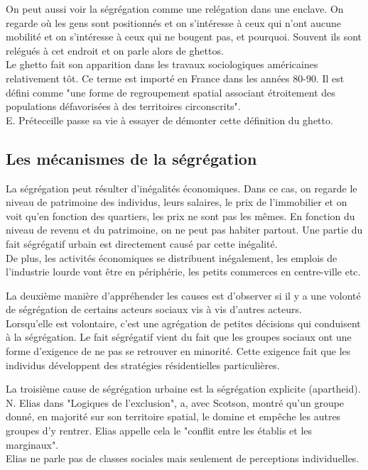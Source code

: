 \documentclass[12pt, a4paper, openany]{book}
\begin{document}
On peut aussi voir la ségrégation comme une relégation dans une enclave. On regarde où les gens sont positionnés et on s'intéresse à ceux qui n'ont aucune mobilité et on s'intéresse à ceux qui ne bougent pas, et pourquoi. Souvent ils sont relégués à cet endroit et on parle alors de ghettos. \\
Le ghetto fait son apparition dans les travaux sociologiques américaines relativement tôt. Ce terme est importé en France dans les années 80-90. Il est défini comme "une forme de regroupement spatial associant étroitement des populations défavorisées à des territoires circonscrits". \\
E. Préteceille passe sa vie à essayer de démonter cette définition du ghetto. 

\subsection{Les mécanismes de la ségrégation}

La ségrégation peut résulter d'inégalités économiques. Dans ce cas, on regarde le niveau de patrimoine des individus, leurs salaires, le prix de l'immobilier et on voit qu'en fonction des quartiers, les prix ne sont pas les mêmes. En fonction du niveau de revenu et du patrimoine, on ne peut pas habiter partout. Une partie du fait ségrégatif urbain est directement causé par cette inégalité. \\
De plus, les activités économiques se distribuent inégalement, les emplois de l'industrie lourde vont être en périphérie, les petits commerces en centre-ville etc. 


La deuxième manière d'appréhender les causes est d'observer si il y a une volonté de ségrégation de certains acteurs sociaux vis à vis d'autres acteurs. \\
Lorsqu'elle est volontaire, c'est une agrégation de petites décisions qui conduisent à la ségrégation. Le fait ségrégatif vient du fait que les groupes sociaux ont une forme d'exigence de ne pas se retrouver en minorité. Cette exigence fait que les individus développent des stratégies résidentielles particulières. 


La troisième cause de ségrégation urbaine est la ségrégation explicite (apartheid). N. Elias dans "Logiques de l'exclusion", a, avec Scotson, montré qu'un groupe donné, en majorité sur son territoire spatial, le domine et empêche les autres groupes d'y rentrer. Elias appelle cela le "conflit entre les établis et les marginaux". \\
Elias ne parle pas de classes sociales mais seulement de perceptions individuelles. 
\end{document}
